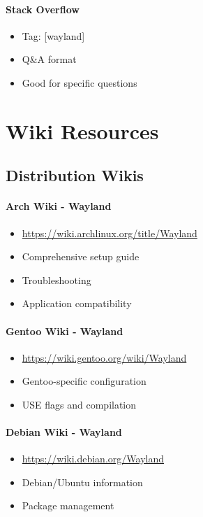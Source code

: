 \paragraph{Stack Overflow}
\begin{itemize}
    \item Tag: [wayland]
    \item Q\&A format
    \item Good for specific questions
\end{itemize}

\section{Wiki Resources}

\subsection{Distribution Wikis}

\paragraph{Arch Wiki - Wayland}
\begin{itemize}
    \item \url{https://wiki.archlinux.org/title/Wayland}
    \item Comprehensive setup guide
    \item Troubleshooting
    \item Application compatibility
\end{itemize}

\paragraph{Gentoo Wiki - Wayland}
\begin{itemize}
    \item \url{https://wiki.gentoo.org/wiki/Wayland}
    \item Gentoo-specific configuration
    \item USE flags and compilation
\end{itemize}

\paragraph{Debian Wiki - Wayland}
\begin{itemize}
    \item \url{https://wiki.debian.org/Wayland}
    \item Debian/Ubuntu information
    \item Package management
\end{itemize}

